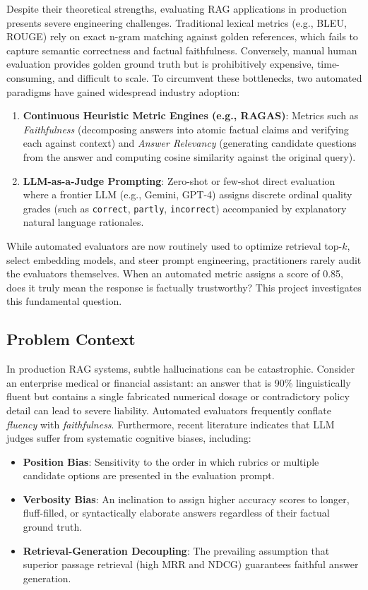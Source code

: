 \documentclass[11pt,a4paper]{article}
\begin{document}
Despite their theoretical strengths, evaluating RAG applications in production presents severe engineering challenges. Traditional lexical metrics (e.g., BLEU, ROUGE) rely on exact n-gram matching against golden references, which fails to capture semantic correctness and factual faithfulness. Conversely, manual human evaluation provides golden ground truth but is prohibitively expensive, time-consuming, and difficult to scale. To circumvent these bottlenecks, two automated paradigms have gained widespread industry adoption:
\begin{enumerate}[leftmargin=*]
    \item \textbf{Continuous Heuristic Metric Engines (e.g., RAGAS)}: Metrics such as \textit{Faithfulness} (decomposing answers into atomic factual claims and verifying each against context) and \textit{Answer Relevancy} (generating candidate questions from the answer and computing cosine similarity against the original query).
    \item \textbf{LLM-as-a-Judge Prompting}: Zero-shot or few-shot direct evaluation where a frontier LLM (e.g., Gemini, GPT-4) assigns discrete ordinal quality grades (such as \texttt{correct}, \texttt{partly}, \texttt{incorrect}) accompanied by explanatory natural language rationales.
\end{enumerate}

While automated evaluators are now routinely used to optimize retrieval top-$k$, select embedding models, and steer prompt engineering, practitioners rarely audit the evaluators themselves. When an automated metric assigns a score of 0.85, does it truly mean the response is factually trustworthy? This project investigates this fundamental question.

\subsection{Problem Context}
In production RAG systems, subtle hallucinations can be catastrophic. Consider an enterprise medical or financial assistant: an answer that is 90\% linguistically fluent but contains a single fabricated numerical dosage or contradictory policy detail can lead to severe liability. Automated evaluators frequently conflate \textit{fluency} with \textit{faithfulness}. Furthermore, recent literature indicates that LLM judges suffer from systematic cognitive biases, including:
\begin{itemize}[leftmargin=*]
    \item \textbf{Position Bias}: Sensitivity to the order in which rubrics or multiple candidate options are presented in the evaluation prompt.
    \item \textbf{Verbosity Bias}: An inclination to assign higher accuracy scores to longer, fluff-filled, or syntactically elaborate answers regardless of their factual ground truth.
    \item \textbf{Retrieval-Generation Decoupling}: The prevailing assumption that superior passage retrieval (high MRR and NDCG) guarantees faithful answer generation.
\end{itemize}
\end{document}
